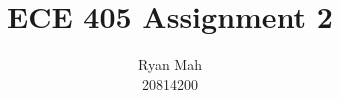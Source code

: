 \documentclass[12pt]{article}
\begin{document}
\title{ECE 405 Assignment 2}
\author{Ryan Mah \\ 20814200}
\date{\vspace{-2ex}}
\maketitle

\newcommand*{\matbf}[1]{\mathbf{#1}}


\end{document}

